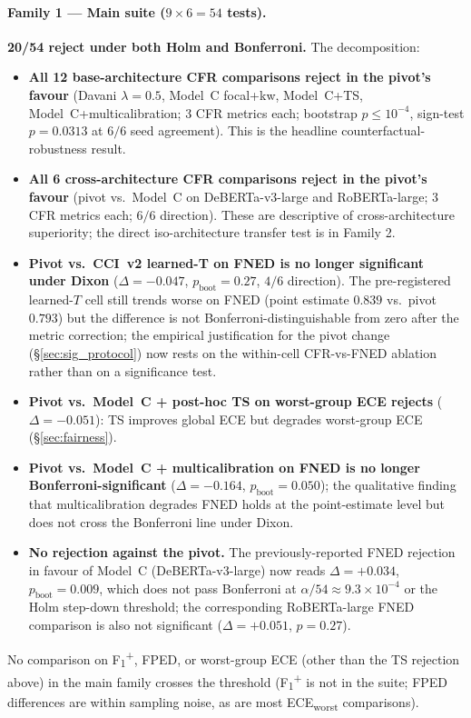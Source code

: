 \paragraph{Family 1 — Main suite ($9 \times 6 = 54$ tests).}
\textbf{20/54 reject under both Holm and Bonferroni.} The decomposition:
\begin{itemize}[leftmargin=*,itemsep=2pt]
    \item \textbf{All 12 base-architecture CFR comparisons reject in the pivot's favour} (Davani $\lambda{=}0.5$, Model~C focal+kw, Model~C+TS, Model~C+multicalibration; 3 CFR metrics each; bootstrap $p \le 10^{-4}$, sign-test $p = 0.0313$ at $6/6$ seed agreement). This is the headline counterfactual-robustness result.
    \item \textbf{All 6 cross-architecture CFR comparisons reject in the pivot's favour} (pivot vs.\ Model~C on DeBERTa-v3-large and RoBERTa-large; 3 CFR metrics each; $6/6$ direction). These are descriptive of cross-architecture superiority; the direct iso-architecture transfer test is in Family 2.
    \item \textbf{Pivot vs.\ CCI~v2 learned-T on FNED is no longer significant under Dixon} ($\Delta = -0.047$, $p_{\text{boot}} = 0.27$, $4/6$ direction). The pre-registered learned-$T$ cell still trends worse on FNED (point estimate $0.839$ vs.\ pivot $0.793$) but the difference is not Bonferroni-distinguishable from zero after the metric correction; the empirical justification for the pivot change (\S\ref{sec:sig_protocol}) now rests on the within-cell CFR-vs-FNED ablation rather than on a significance test.
    \item \textbf{Pivot vs.\ Model~C + post-hoc TS on worst-group ECE rejects} ($\Delta = -0.051$): TS improves global ECE but degrades worst-group ECE (\S\ref{sec:fairness}).
    \item \textbf{Pivot vs.\ Model~C + multicalibration on FNED is no longer Bonferroni-significant} ($\Delta = -0.164$, $p_{\text{boot}} = 0.050$); the qualitative finding that multicalibration degrades FNED holds at the point-estimate level but does not cross the Bonferroni line under Dixon.
    \item \textbf{No rejection against the pivot.} The previously-reported FNED rejection in favour of Model~C (DeBERTa-v3-large) now reads $\Delta = +0.034$, $p_{\text{boot}} = 0.009$, which does not pass Bonferroni at $\alpha/54 \approx 9.3\times 10^{-4}$ or the Holm step-down threshold; the corresponding RoBERTa-large FNED comparison is also not significant ($\Delta = +0.051$, $p = 0.27$).
\end{itemize}
No comparison on F\textsubscript{1}\textsuperscript{+}, FPED, or worst-group ECE (other than the TS rejection above) in the main family crosses the threshold (F\textsubscript{1}\textsuperscript{+} is not in the suite; FPED differences are within sampling noise, as are most ECE\textsubscript{worst} comparisons).

